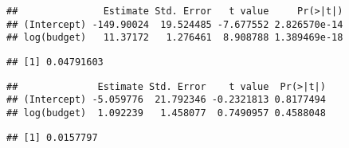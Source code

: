 \documentclass[
]{article}
\newenvironment{Shaded}{\begin{snugshade}}{\end{snugshade}}
\newcommand{\DecValTok}[1]{\textcolor[rgb]{0.00,0.00,0.81}{#1}}
\newcommand{\FunctionTok}[1]{\textcolor[rgb]{0.00,0.00,0.00}{#1}}
\newcommand{\NormalTok}[1]{#1}
\newcommand{\SpecialCharTok}[1]{\textcolor[rgb]{0.00,0.00,0.00}{#1}}
\begin{document}
\begin{Shaded}
\end{Shaded}

\begin{verbatim}
##               Estimate Std. Error   t value     Pr(>|t|)
## (Intercept) -149.90024  19.524485 -7.677552 2.826570e-14
## log(budget)   11.37172   1.276461  8.908788 1.389469e-18
\end{verbatim}

\begin{Shaded}
\end{Shaded}

\begin{verbatim}
## [1] 0.04791603
\end{verbatim}

\begin{Shaded}
\end{Shaded}

\begin{verbatim}
##              Estimate Std. Error    t value  Pr(>|t|)
## (Intercept) -5.059776  21.792346 -0.2321813 0.8177494
## log(budget)  1.092239   1.458077  0.7490957 0.4588048
\end{verbatim}

\begin{Shaded}
\end{Shaded}

\begin{verbatim}
## [1] 0.0157797
\end{verbatim}
\end{document}
